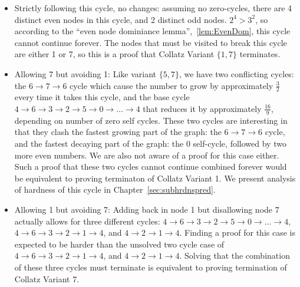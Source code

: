 \begin{itemize}
    \begin{itemize}
        \item Strictly following this cycle, no changes: assuming no zero-cycles, there are 4 distinct even nodes in this cycle, and 2 distinct odd nodes. $2^4 > 3^2$, so according to the ``even node dominiance lemma'',~\ref{lem:EvenDom}, this cycle cannot continue forever. The nodes that must be visited to break this cycle are either 1 or 7, so this is a proof that Collatz Variant $\{1,7\}$ terminates.
        \item Allowing 7 but avoiding 1: Like variant $\{5,7\}$, we have two conflicting cycles: the $6 \rightarrow 7 \rightarrow 6$ cycle which cause the number to grow by approximately $\frac{3}{2}$ every time it takes this cycle, and the base cycle $4 \rightarrow 6 \rightarrow 3 \rightarrow 2 \rightarrow 5 \rightarrow 0 \rightarrow \ldots \rightarrow 4$ that reduces it by approximately $\frac{16}{9}$, depending on number of zero self cycles. These two cycles are interesting in that they clash the fastest growing part of the graph: the $6 \rightarrow 7 \rightarrow 6$ cycle, and the fastest decaying part of the graph: the 0 self-cycle, followed by two more even numbers. We are also not aware of a proof for this case either. Such a proof that these two cycles cannot continue combined forever would be equivalent to proving terminaton of Collatz Variant 1. We present analysis of hardness of this cycle in Chapter~\ref{sec:subhrdnspred}.
        \item Allowing 1 but avoiding 7: Adding back in node 1 but disallowing node 7 actually allows for three different cycles: $4 \rightarrow 6 \rightarrow 3 \rightarrow 2 \rightarrow 5 \rightarrow 0 \rightarrow \ldots \rightarrow 4$, $4 \rightarrow 6 \rightarrow 3 \rightarrow 2 \rightarrow 1 \rightarrow 4$, and $4 \rightarrow 2 \rightarrow 1 \rightarrow 4$.  Finding a proof for this case is expected to be harder than the unsolved two cycle case of $4 \rightarrow 6 \rightarrow 3 \rightarrow 2 \rightarrow 1 \rightarrow 4$, and $4 \rightarrow 2 \rightarrow 1 \rightarrow 4$. Solving that the combination of these three cycles must terminate is equivalent to proving termination of Collatz Variant 7.
    \end{itemize}
\end{itemize}

